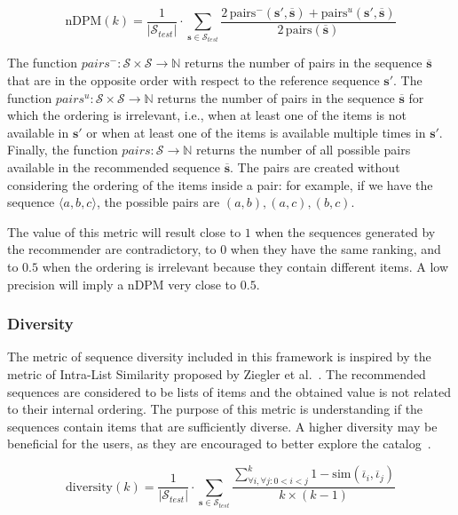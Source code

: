 \begin{equation}
\mathrm{nDPM}(k) = \frac{1}{|\mathcal{S}_{test}|} \cdot \sum_{\mathbf{s} \in \mathcal{S}_{test}} \frac{2\,\mathrm{pairs}^-(\mathbf{s'}, \mathbf{\overline{s}}) + \mathrm{pairs}^u(\mathbf{s'}, \mathbf{\overline{s}})}{2\,\mathrm{pairs}(\mathbf{\overline{s}})}
\end{equation}

The function $pairs^- : \mathcal{S} \times \mathcal{S} \to \mathbb{N}$ returns the number of pairs in the sequence $\mathbf{\overline{s}}$ that are in the opposite order with respect to the reference sequence $\mathbf{s'}$. The function $pairs^u : \mathcal{S} \times \mathcal{S} \to \mathbb{N}$ returns the number of pairs in the sequence $\mathbf{\overline{s}}$ for which the ordering is irrelevant, i.e., when at least one of the items is not available in $\mathbf{s'}$ or when at least one of the items is available multiple times in $\mathbf{s'}$. Finally, the function $pairs : \mathcal{S} \to \mathbb{N}$ returns the number of all possible pairs available in the recommended sequence $\mathbf{\overline{s}}$. The pairs are created without considering the ordering of the items inside a pair: for example, if we have the sequence $\langle a, b, c \rangle$, the possible pairs are $(a, b),\allowbreak (a, c),\allowbreak (b, c)$.

The value of this metric will result close to $1$ when the sequences generated by the recommender are contradictory, to $0$ when they have the same ranking, and to $0.5$ when the ordering is irrelevant because they contain different items. A low precision will imply a nDPM very close to $0.5$.

\subsubsection{Diversity}

The metric of sequence diversity included in this framework is inspired by the metric of Intra-List Similarity proposed by Ziegler et al.~\cite{Ziegler2005}. The recommended sequences are considered to be lists of items and the obtained value is not related to their internal ordering. The purpose of this metric is understanding if the sequences contain items that are sufficiently diverse. A higher diversity may be beneficial for the users, as they are encouraged to better explore the catalog~\cite{Noia2014}.

\begin{equation}
\mathrm{diversity}(k) = \frac{1}{|\mathcal{S}_{test}|} \cdot \sum_{\mathbf{s} \in \mathcal{S}_{test}} \frac{\sum_{\forall{i}, \forall{j} : 0 < i < j}^k 1 - \mathrm{sim}(\overline{\iota}_i, \overline{\iota}_j)}{k \times (k - 1)}
\end{equation}

